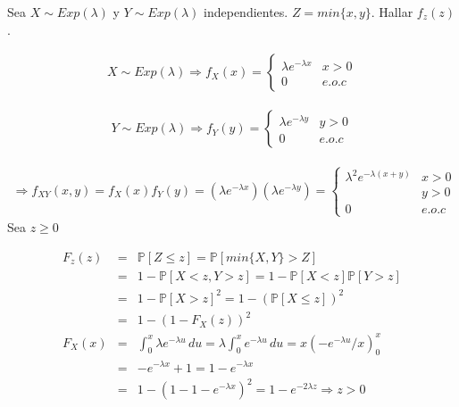 \begin{Ejem}
 Sea $X \sim Exp \left( \lambda \right)$ y $Y \sim Exp \left( \lambda\right)$ independientes. $Z = min \{ x,y \}$. Hallar $f_{z} \left( z \right)$.

\begin{eqnarray*}
X\sim Exp \left(\lambda\right) \Rightarrow f_{X}\left( x \right)= 
\begin{cases}
\lambda e^{- \lambda x }  & x > 0\\
0 & e.o.c
\end{cases}
\end{eqnarray*}

\begin{eqnarray*}
Y\sim Exp \left(\lambda\right) \Rightarrow f_{Y}\left( y \right)= 
\begin{cases}
\lambda e^{- \lambda y }  & y > 0\\
0 & e.o.c
\end{cases}
\end{eqnarray*}

\begin{eqnarray*}
\Rightarrow f_{XY} \left( x,y\right) = f_{X}\left(x\right)f_{Y}\left(y\right)= \left(\lambda e^{- \lambda x} \right)\left(\lambda e ^{-\lambda y } \right)=
\begin{cases}
\lambda^{2} e^{- \lambda \left(x+y \right) }  & x > 0\\
& y>0\\
0 & e.o.c
\end{cases}
\end{eqnarray*}
Sea $z \geq 0$

\begin{eqnarray*}
F_{z} \left( z \right)&=& \mathbb{P} \left[Z \leq z \right]= \mathbb{P} \left[ min \{X,Y \} > Z \right] \\
&=& 1- \mathbb{P} \left[ X < z , Y > z\right]= 1- \mathbb{P} \left[ X < z\right]\mathbb{P}\left[ Y > z\right]\\
&=& 1-\mathbb{P}\left[ X > z\right]^{2} =  1 -\left( \mathbb{P} \left[ X \leq z\right] \right) ^{2}\\
&=& 1 - \left( 1- F_{X} \left( z \right) \right) ^{2}\\
F_{X} \left( x \right) &=& \int_{0}^{x} \lambda e^{-\lambda u} \, du = \lambda \int_{0}^{x}  e^{-\lambda u} \, du = x\left(-e ^{- \lambda u} /\! x\right)_{0}^{x}\\
&=& -e ^{- \lambda x} + 1 = 1 -e ^{- \lambda x}\\
&=& 1 - \left(1-1-e ^{- \lambda x} \right)^{2} = 1- e ^{- 2 \lambda z}  \Rightarrow z>0\\
\end{eqnarray*}
\end{Ejem}

